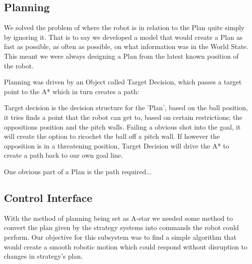 \subsection{Planning}



We solved the problem of where the robot is in relation to the Plan quite simply
by ignoring it. That is to say we developed a model that would create a Plan
as fast as possible, as often as possible, on what information was in the World
State. This meant we were always designing a Plan from the latest known position 
of the robot.

Planning was driven by an Object called Target Decision, which passes a target
point to the A* which in turn creates a path:


Target decision is the decision structure for the 'Plan', based on the ball 
position, it tries finds a point that the robot can get to, based on certain 
restrictions; the oppositions position and the pitch walls. Failing a obvious
shot into the goal, it will create the option to ricochet the ball off a pitch
wall. If however the opposition is in a threatening position, Target Decision
will drive the A* to create a path back to our own goal line.


One obvious part of a Plan is the path required...

\subsection{Control Interface}

With the method of planning being set as A-star we needed some method to
convert the plan given by the strategy systems into commands the robot could
perform. Our objective for this subsystem was to find a simple algorithm that
would create a smooth robotic motion which could respond without disruption to
changes in strategy's plan.


